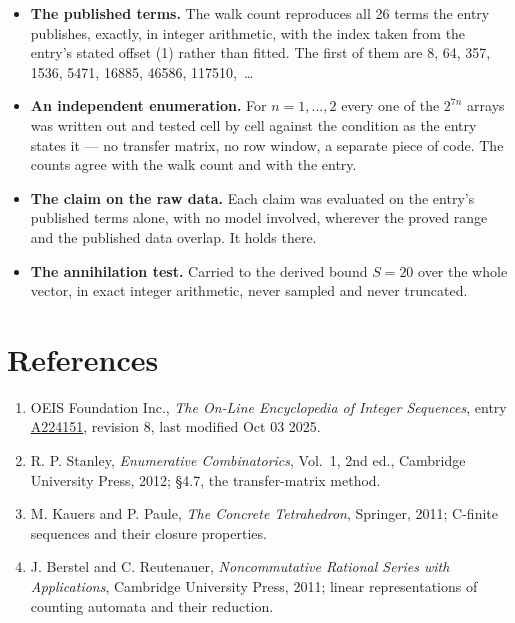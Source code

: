 \documentclass[11pt]{article}
\theoremstyle{definition}
\begin{document}
\begin{itemize}

\item {\bfseries The published terms.} The walk count reproduces all 26 terms the entry publishes, exactly, in integer arithmetic, with the index taken from the entry's stated offset (1) rather than fitted. The first of them are 8, 64, 357, 1536, 5471, 16885, 46586, 117510,~\dots

\item {\bfseries An independent enumeration.} For $n = 1,\dots,2$ every one of the $2^{7n}$ arrays was written out and tested cell by cell against the condition as the entry states it --- no transfer matrix, no row window, a separate piece of code. The counts agree with the walk count and with the entry.

\item {\bfseries The claim on the raw data.} Each claim was evaluated on the entry's published terms alone, with no model involved, wherever the proved range and the published data overlap. It holds there.

\item {\bfseries The annihilation test.} Carried to the derived bound $S = 20$ over the whole vector, in exact integer arithmetic, never sampled and never truncated.

\end{itemize}

\section{References}

\begin{enumerate}

\item OEIS Foundation Inc., \emph{The On-Line Encyclopedia of Integer Sequences}, entry \href{https://oeis.org/A224151}{A224151}, revision 8, last modified Oct 03 2025.

\item R. P. Stanley, \emph{Enumerative Combinatorics}, Vol.~1, 2nd ed., Cambridge University Press, 2012; \S4.7, the transfer-matrix method.

\item M. Kauers and P. Paule, \emph{The Concrete Tetrahedron}, Springer, 2011; C-finite sequences and their closure properties.

\item J. Berstel and C. Reutenauer, \emph{Noncommutative Rational Series with Applications}, Cambridge University Press, 2011; linear representations of counting automata and their reduction.

\end{enumerate}
\end{document}
